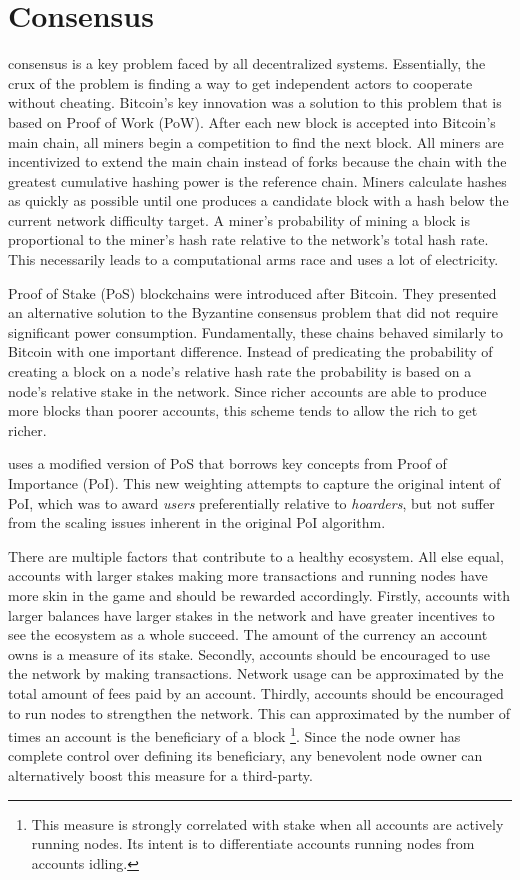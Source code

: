 \section{Consensus}
\label{sec:consensus}

\nemquote{
}{}

 consensus is a key problem faced by all decentralized systems.
Essentially, the crux of the problem is finding a way to get independent actors to cooperate without cheating.
Bitcoin's key innovation was a solution to this problem that is based on Proof of Work (PoW).
After each new block is accepted into Bitcoin's main chain, all miners begin a competition to find the next block.
All miners are incentivized to extend the main chain instead of forks because the chain with the greatest cumulative hashing power is the reference chain.
Miners calculate hashes as quickly as possible until one produces a candidate block with a hash below the current network difficulty target.
A miner's probability of mining a block is proportional to the miner's hash rate relative to the network's total hash rate.
This necessarily leads to a computational arms race and uses a lot of electricity.

Proof of Stake (PoS) blockchains were introduced after Bitcoin.
They presented an alternative solution to the Byzantine consensus problem that did not require significant power consumption.
Fundamentally, these chains behaved similarly to Bitcoin with one important difference.
Instead of predicating the probability of creating a block on a node's relative hash rate the probability is based on a node's relative stake in the network.
Since richer accounts are able to produce more blocks than poorer accounts, this scheme tends to allow the rich to get richer.

\codenamespace uses a modified version of PoS that borrows key concepts from Proof of Importance (PoI).
This new weighting attempts to capture the original intent of PoI, which was to award \emph{users} preferentially relative to \emph{hoarders}, but not suffer from the scaling issues inherent in the original PoI algorithm.

There are multiple factors that contribute to a healthy ecosystem.
All else equal, accounts with larger stakes making more transactions and running nodes have more skin in the game and should be rewarded accordingly.
Firstly, accounts with larger balances have larger stakes in the network and have greater incentives to see the ecosystem as a whole succeed.
The amount of the currency an account owns is a measure of its stake.
Secondly, accounts should be encouraged to use the network by making transactions.
Network usage can be approximated by the total amount of fees paid by an account.
Thirdly, accounts should be encouraged to run nodes to strengthen the network.
This can approximated by the number of times an account is the beneficiary of a block
\footnote{
	This measure is strongly correlated with stake when all accounts are actively running nodes.
	Its intent is to differentiate accounts running nodes from accounts idling.
}.
Since the node owner has complete control over defining its beneficiary, any benevolent node owner can alternatively boost this measure for a third-party.

